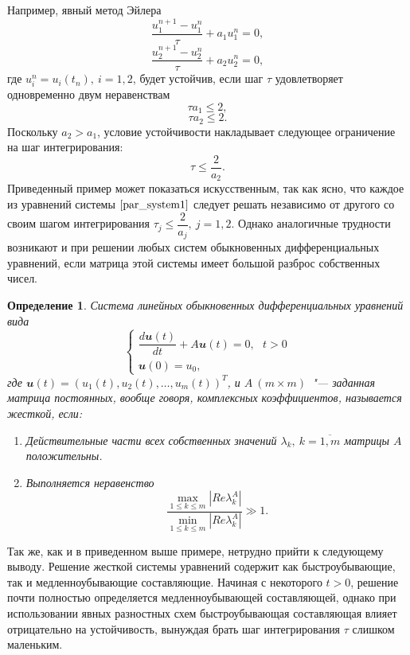 \documentclass[11pt,a4paper,twoside]{report}
\numberwithin{equation}{section}
\newtheorem*{definition}{Определение}
\theoremstyle{definition}
\theoremstyle{plain}
\newcommand{\vfunc}[1]{\mathbfit{#1}}
\begin{document}
Например, явный метод Эйлера
%
$$
    \dfrac{u_1^{n+1} - u_1^n}{\tau} + a_1u_1^n = 0,
$$
%
$$
    \dfrac{u_2^{n+1} - u_2^n}{\tau} + a_2u_2^n = 0,
$$
%
где $u_i^n = u_i(t_n),~i=1,2$, будет устойчив, если шаг $\tau$
удовлетворяет одновременно двум неравенствам
%
$$
    \tau a_1 \leqslant 2,
$$
%
$$
    \tau a_2 \leqslant 2.
$$
%
Поскольку $a_2 > a_1$, условие устойчивости накладывает следующее
ограничение на шаг интегрирования:
%
$$
    \tau \leqslant \dfrac{2}{a_2}.
$$
%
Приведенный пример может показаться искусственным, так как ясно,
что каждое из уравнений системы $\eqref{par_system1}$ следует
решать независимо от другого со своим шагом интегрирования
$\tau_j \leqslant \dfrac{2}{a_j},~j=1,2$. Однако аналогичные трудности
возникают и при решении любых систем обыкновенных дифференциальных уравнений,
если матрица этой системы имеет большой разброс собственных чисел.
%
\begin{definition}
%
    Система линейных обыкновенных дифференциальных уравнений вида
    $$
        \begin{cases}
            \dfrac{d\vfunc{u}(t)}{dt} + A\vfunc{u}(t) = 0,~~~ t>0 \\
            \vfunc{u}(0)=u_0,
        \end{cases}
    $$
    где $\vfunc{u}(t) = (u_1(t), u_2(t), \ldots, u_m(t))^T$, и $A~(m \times m)$~"--- заданная
    матрица постоянных, вообще говоря, комплексных коэффициентов, называется жесткой,
    если:
    \begin{enumerate}
        \item
        Действительные части всех собственных значений
        $\lambda_k,~k=\overline{1,m}$ матрицы $A$ положительны.
        \item
        Выполняется неравенство
        $$
            \dfrac{\underset{1 \leqslant k \leqslant m}
            \max\left|Re\lambda^A_k\right|}{\underset{1 \leqslant k
            \leqslant m}\min\left|Re\lambda^A_k\right|} \gg 1.
        $$
    \end{enumerate}
%
\end{definition}
%
Так же, как и в приведенном выше примере, нетрудно прийти к следующему выводу.
Решение жесткой системы уравнений содержит как быстроубывающие, так и
медленноубывающие составляющие. Начиная с некоторого $t > 0$, решение
почти полностью определяется медленноубывающей составляющей, однако при
использовании явных разностных схем быстроубывающая составляющая влияет
отрицательно на устойчивость, вынуждая брать шаг интегрирования $\tau$
слишком маленьким.
\end{document}
